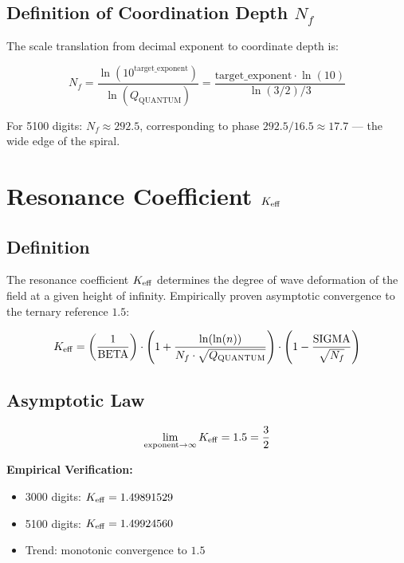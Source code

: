 \documentclass[12pt,a4paper]{article}
\newcommand{\Qquantum}{Q_{\text{QUANTUM}}}
\newcommand{\SIGMA}{\text{SIGMA}}
\newcommand{\BETA}{\text{BETA}}
\begin{document}
	\subsection{Definition of Coordination Depth \(N_f\)}
	
	The scale translation from decimal exponent to coordinate depth is:
	
	\begin{equation}
		N_f = \frac{\ln(10^{\text{target\_exponent}})}{\ln(\Qquantum)} = \frac{\text{target\_exponent} \cdot \ln(10)}{\ln(3/2)/3}
		\label{eq:nf}
	\end{equation}
	
	\begin{verifiedbox}
		For 5100 digits: \(N_f \approx 292.5\), corresponding to phase \(292.5/16.5 \approx 17.7\) — the wide edge of the spiral.
	\end{verifiedbox}
	
	\section{Resonance Coefficient \(\Keff\)}
	
	\subsection{Definition}
	
	The resonance coefficient \(\Keff\) determines the degree of wave deformation of the field at a given height of infinity. Empirically proven asymptotic convergence to the ternary reference \(1.5\):
	
	\begin{equation}
		\Keff = \left(\frac{1}{\BETA}\right) \cdot \left(1 + \frac{\ln(\ln(n))}{N_f \cdot \sqrt{\Qquantum}}\right) \cdot \left(1 - \frac{\SIGMA}{\sqrt{N_f}}\right)
		\label{eq:keff}
	\end{equation}
	
	\subsection{Asymptotic Law}
	
	\begin{equation}
		\lim_{\text{exponent} \to \infty} \Keff = 1.5 = \frac{3}{2}
		\label{eq:keff-asymptotic}
	\end{equation}
	
	\begin{verifiedbox}
		\textbf{Empirical Verification:}
		\begin{itemize}
			\item 3000 digits: \(\Keff = 1.49891529\)
			\item 5100 digits: \(\Keff = 1.49924560\)
			\item Trend: monotonic convergence to \(1.5\)
		\end{itemize}
	\end{verifiedbox}
	
\end{document}
